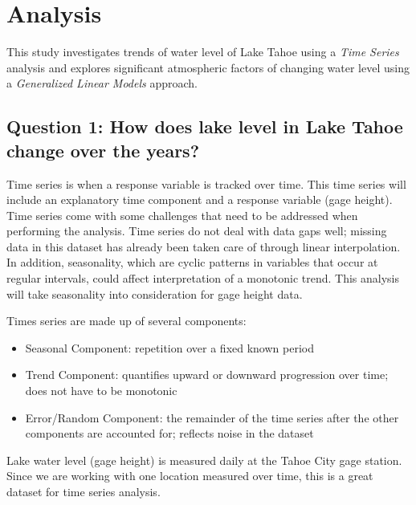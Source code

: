 \documentclass[12pt,]{article}
\providecommand{\tightlist}{%
  \setlength{\itemsep}{0pt}\setlength{\parskip}{0pt}}
\begin{document}
\newpage

\hypertarget{analysis}{%
\section{Analysis}\label{analysis}}

This study investigates trends of water level of Lake Tahoe using a
\emph{Time Series} analysis and explores significant atmospheric factors
of changing water level using a \emph{Generalized Linear Models}
approach.

\hypertarget{question-1-how-does-lake-level-in-lake-tahoe-change-over-the-years}{%
\subsection{Question 1: How does lake level in Lake Tahoe change over
the
years?}\label{question-1-how-does-lake-level-in-lake-tahoe-change-over-the-years}}

Time series is when a response variable is tracked over time. This time
series will include an explanatory time component and a response
variable (gage height). Time series come with some challenges that need
to be addressed when performing the analysis. Time series do not deal
with data gaps well; missing data in this dataset has already been taken
care of through linear interpolation. In addition, seasonality, which
are cyclic patterns in variables that occur at regular intervals, could
affect interpretation of a monotonic trend. This analysis will take
seasonality into consideration for gage height data.

Times series are made up of several components:

\begin{itemize}
\tightlist
\item
  Seasonal Component: repetition over a fixed known period
\item
  Trend Component: quantifies upward or downward progression over time;
  does not have to be monotonic
\item
  Error/Random Component: the remainder of the time series after the
  other components are accounted for; reflects noise in the dataset
\end{itemize}

Lake water level (gage height) is measured daily at the Tahoe City gage
station. Since we are working with one location measured over time, this
is a great dataset for time series analysis.
\end{document}
